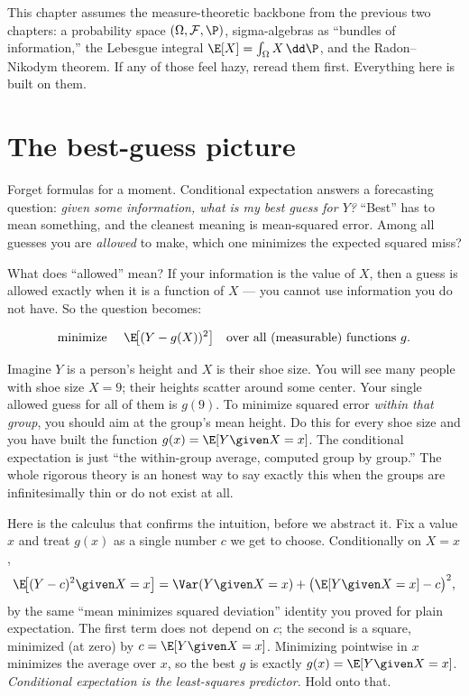 \begin{focusbox}
This chapter assumes the measure-theoretic backbone from the previous two chapters: a probability
space $(\Omega, \mathcal{F}, \P)$, sigma-algebras as ``bundles of information,'' the Lebesgue
integral $\E[X] = \int_\Omega X \,\dd\P$, and the Radon--Nikodym theorem. If any of those feel hazy,
reread them first. Everything here is built on them.
\end{focusbox}

\section{The best-guess picture}
\label{ch38:best-guess}

Forget formulas for a moment. Conditional expectation answers a forecasting question: \emph{given
some information, what is my best guess for $Y$?} ``Best'' has to mean something, and the cleanest
meaning is mean-squared error. Among all guesses you are \emph{allowed} to make, which one minimizes
the expected squared miss?

What does ``allowed'' mean? If your information is the value of $X$, then a guess is allowed exactly
when it is a function of $X$ --- you cannot use information you do not have. So the question becomes:

\begin{equation}
\label{ch38:l2-problem}
  \text{minimize } \quad \E\!\big[(Y - g(X))^2\big] \quad \text{over all (measurable) functions } g.
\end{equation}

\begin{intuitionbox}
Imagine $Y$ is a person's height and $X$ is their shoe size. You will see many people with shoe size
$X = 9$; their heights scatter around some center. Your single allowed guess for all of them is
$g(9)$. To minimize squared error \emph{within that group}, you should aim at the group's mean
height. Do this for every shoe size and you have built the function $g(x) = \E[Y \given X = x]$. The
conditional expectation is just ``the within-group average, computed group by group.'' The whole
rigorous theory is an honest way to say exactly this when the groups are infinitesimally thin or do
not exist at all.
\end{intuitionbox}

Here is the calculus that confirms the intuition, before we abstract it. Fix a value $x$ and treat
$g(x)$ as a single number $c$ we get to choose. Conditionally on $X = x$,
\[
  \E\!\big[(Y - c)^2 \given X = x\big] = \Var(Y \given X = x) + \big(\E[Y \given X = x] - c\big)^2,
\]
by the same ``mean minimizes squared deviation'' identity you proved for plain expectation. The first
term does not depend on $c$; the second is a square, minimized (at zero) by $c = \E[Y \given X = x]$.
Minimizing pointwise in $x$ minimizes the average over $x$, so the best $g$ is exactly $g(x) =
\E[Y \given X = x]$. \emph{Conditional expectation is the least-squares predictor.} Hold onto that.

